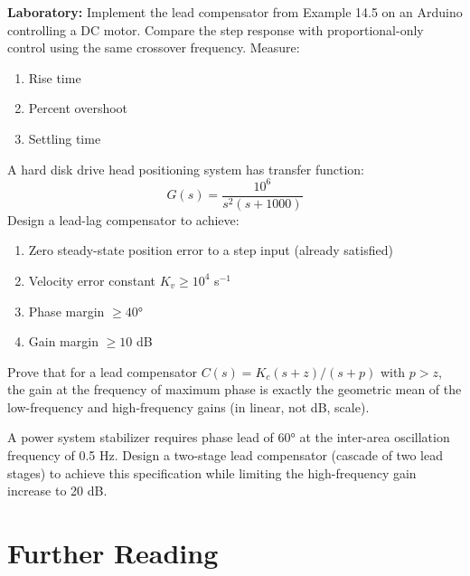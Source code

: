 \begin{exercise}
\textbf{Laboratory:} Implement the lead compensator from Example 14.5 on an Arduino controlling a DC motor. Compare the step response with proportional-only control using the same crossover frequency. Measure:
\begin{enumerate}
    \item Rise time
    \item Percent overshoot
    \item Settling time
\end{enumerate}
\end{exercise}

\begin{exercise}
A hard disk drive head positioning system has transfer function:
\[
G(s) = \frac{10^6}{s^2(s+1000)}
\]
Design a lead-lag compensator to achieve:
\begin{enumerate}
    \item Zero steady-state position error to a step input (already satisfied)
    \item Velocity error constant $K_v \geq 10^4$ s$^{-1}$
    \item Phase margin $\geq 40°$
    \item Gain margin $\geq 10$ dB
\end{enumerate}
\end{exercise}

\begin{exercise}
Prove that for a lead compensator $C(s) = K_c(s+z)/(s+p)$ with $p > z$, the gain at the frequency of maximum phase is exactly the geometric mean of the low-frequency and high-frequency gains (in linear, not dB, scale).
\end{exercise}

\begin{exercise}
A power system stabilizer requires phase lead of 60° at the inter-area oscillation frequency of 0.5 Hz. Design a two-stage lead compensator (cascade of two lead stages) to achieve this specification while limiting the high-frequency gain increase to 20 dB.
\end{exercise}

\section*{Further Reading}

